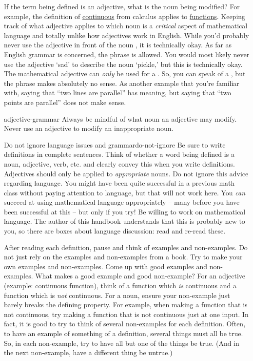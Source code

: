 \documentclass{book}
\theoremstyle{ekimcustom}
\begin{document}
If the term being defined is an adjective, what is the noun being modified? For example, the definition of \underline{continuous} from calculus applies to \underline{functions}. Keeping track of what adjective applies to which noun is a \emph{critical} aspect of mathematical language and totally unlike how adjectives work in English. While you'd probably never use the adjective  in front of the noun , it is technically okay. As far as English grammar is concerned, the phrase  is allowed. 
You would most likely never use the adjective `sad' to describe the noun `pickle,' but this is technically okay.
The mathematical adjective  can \emph{only} be used for a . So, you can speak of a , but the phrase  makes absolutely no sense. As another example that you're familiar with, saying that ``two lines are parallel'' has meaning, but saying that ``two points are parallel'' does not make sense.
\begin{bwarning}{}{adjective-grammar}
Always be mindful of what noun an adjective may modify. Never use an adjective to modify an inappropriate noun.
\end{bwarning}
\begin{bwarning}{Do not ignore language issues and grammar}{do-not-ignore}
Be sure to write definitions in complete sentences. Think of whether a word being defined is a noun, adjective, verb, etc. and clearly convey this when you write definitions. Adjectives should only be applied to \emph{appropriate} nouns. Do not ignore this advice regarding language. You might have been quite successful in a previous math class without paying attention to language, but that will not work here.
\vskip6pt
You \emph{can} succeed at using mathematical language appropriately -- many before you have been successful at this -- but only if you try! Be willing to work on mathematical language. The author of this handbook understands that this is probably new to you, so there are boxes about language discussion: read and re-read these.
\end{bwarning}
After reading each definition, pause and think of examples and non-examples. Do not just rely on the examples and non-examples from a book. Try to make your own examples and non-examples. Come up with good examples and non-examples. What makes a good example and good non-example? For an adjective (example: continuous function), think of a function which \emph{is} continuous and a function which is \emph{not} continuous. For a noun, ensure your non-example just barely breaks the defining property. For example, when making a function that is not continuous, try making a function that is not continuous just at one input. In fact, it is good to try to think of several non-examples for each definition. Often, to have an example of something of a definition, several things must all be true. So, in each non-example, try to have all but one of the things be true. (And in the next non-example, have a different thing be untrue.)
\end{document}
